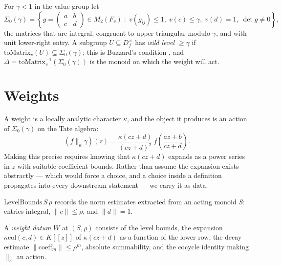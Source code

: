 \begin{definition}
  \label{def:sigma0}
  \leanok
  For $\gamma < 1$ in the value group let
  \[
    \Sigma_0(\gamma) = \left\{ g = \begin{pmatrix} a & b \\ c & d\end{pmatrix} \in M_2(F_v) \;:\;
    v(g_{ij}) \leq 1, \; v(c) \leq \gamma, \; v(d) = 1, \; \det g \neq 0 \right\},
  \]
  the matrices that are integral, congruent to upper-triangular modulo $\gamma$, and with unit
  lower-right entry.  A subgroup $U \subseteq D_f^\times$ has \emph{wild level $\geq \gamma$} if
  $\mathrm{toMatrix}_v(U) \subseteq \Sigma_0(\gamma)$; this is Buzzard's condition
  \cite[\S9]{Buzzard}, and $\Delta = \mathrm{toMatrix}_v^{-1}(\Sigma_0(\gamma))$ is the monoid on
  which the weight will act.
\end{definition}

\section{Weights}

A weight is a locally analytic character $\kappa$, and the object it produces is an action of
$\Sigma_0(\gamma)$ on the Tate algebra:
\[
  (f \|_\kappa \gamma)(z) = \frac{\kappa(cz+d)}{(cz+d)^2}\, f\!\left(\frac{az+b}{cz+d}\right).
\]
Making this precise requires knowing that $\kappa(cz+d)$ expands as a power series in $z$ with
suitable coefficient bounds.  Rather than assume the expansion exists abstractly --- which would
force a choice, and a choice inside a definition propagates into every downstream statement ---
we carry it as data.

\begin{definition}
  \label{def:levelbounds}
  \leanok
  $\mathrm{LevelBounds}\, S\, \rho$ records the norm estimates extracted from an acting monoid
  $S$: entries integral, $\lVert c \rVert \leq \rho$, and $\lVert d \rVert = 1$.
\end{definition}

\begin{definition}
  \label{def:weightseries}
  \leanok
  A \emph{weight datum} $W$ at $(S, \rho)$ consists of the level bounds, the expansion
  $\kappa\mathrm{col}(c,d) \in K[[z]]$ of $\kappa(cz+d)$ as a function of the lower row, the
  decay estimate $\lVert \mathrm{coeff}_m \rVert \leq \rho^m$, absolute summability, and the
  cocycle identity making $\|_\kappa$ an action.
\end{definition}


